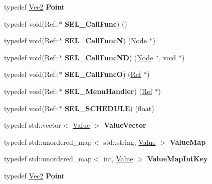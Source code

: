 \begin{DoxyCompactItemize}
\item 
\mbox{\label{group__base_ga88a3f2910d3251f3323477ff1393fa20}} 
typedef \hyperlink{classVec2}{Vec2} {\bfseries Point}
\item 
\mbox{\label{group__base_ga19c9d21cc6cacf9e102c7f405310968f}} 
typedef void(Ref\+::$\ast$ {\bfseries S\+E\+L\+\_\+\+Call\+Func}) ()
\item 
\mbox{\label{group__base_ga2421ba5f5eda401b167fffc76aba09c5}} 
typedef void(Ref\+::$\ast$ {\bfseries S\+E\+L\+\_\+\+Call\+FuncN}) (\hyperlink{classNode}{Node} $\ast$)
\item 
\mbox{\label{group__base_gade4d3700760c07b48e683e15ed122791}} 
typedef void(Ref\+::$\ast$ {\bfseries S\+E\+L\+\_\+\+Call\+Func\+ND}) (\hyperlink{classNode}{Node} $\ast$, void $\ast$)
\item 
\mbox{\label{group__base_gaef899e90936c229c2b588d816146898a}} 
typedef void(Ref\+::$\ast$ {\bfseries S\+E\+L\+\_\+\+Call\+FuncO}) (\hyperlink{classRef}{Ref} $\ast$)
\item 
\mbox{\label{group__base_gaa8b7b2585a8284d5b04a91137d227155}} 
typedef void(Ref\+::$\ast$ {\bfseries S\+E\+L\+\_\+\+Menu\+Handler}) (\hyperlink{classRef}{Ref} $\ast$)
\item 
\mbox{\label{group__base_gaf362983c7356c901e3efefc9aff49f55}} 
typedef void(Ref\+::$\ast$ {\bfseries S\+E\+L\+\_\+\+S\+C\+H\+E\+D\+U\+LE}) (float)
\item 
\mbox{\label{group__base_ga9ef3555e979a203b9619881b61866ca0}} 
typedef std\+::vector$<$ \hyperlink{classValue}{Value} $>$ {\bfseries Value\+Vector}
\item 
\mbox{\label{group__base_gae44b8cec5fcb05722ab75a7ca2f03fee}} 
typedef std\+::unordered\+\_\+map$<$ std\+::string, \hyperlink{classValue}{Value} $>$ {\bfseries Value\+Map}
\item 
\mbox{\label{group__base_ga733d2ae0a5704948dcfad9c985507cff}} 
typedef std\+::unordered\+\_\+map$<$ int, \hyperlink{classValue}{Value} $>$ {\bfseries Value\+Map\+Int\+Key}
\item 
\mbox{\label{group__base_ga88a3f2910d3251f3323477ff1393fa20}} 
typedef \hyperlink{classVec2}{Vec2} {\bfseries Point}
\end{DoxyCompactItemize}
